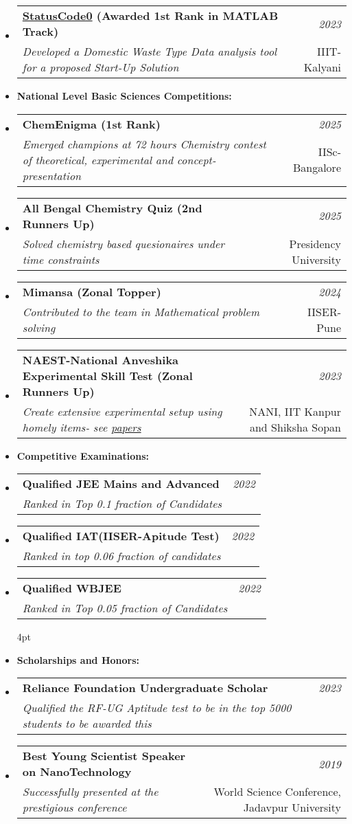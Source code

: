 \documentclass[a4paper,9pt]{article}
\makeatletter
\newcommand{\resumeSubheading}[4]{
    \item\small{
        \begin{tabular*}{0.97\textwidth}[t]{l@{\extracolsep{\fill}}r}
            \textbf{#1} & \textit{#2} \\
            \textit{#3} & \small{#4}
        \end{tabular*}
    }\vspace{3pt}
}
\makeatother
\begin{document}
{\begin{itemize}[leftmargin=*,label={},itemsep=4pt]
        \resumeSubheading{\href{https://statuscode0.devfolio.co/}{StatusCode0} (Awarded 1st Rank in MATLAB Track)}{2023}
    {Developed a Domestic Waste Type Data analysis tool for a proposed Start-Up Solution}{IIIT-Kalyani}
 
 \vspace{4pt}
    \large \item \textbf{National Level Basic Sciences Competitions:}
        \resumeSubheading{ChemEnigma (1st Rank)}{2025}
    {Emerged champions at 72 hours Chemistry contest of theoretical, experimental and concept-presentation}{IISc-Bangalore}
    \resumeSubheading{All Bengal Chemistry Quiz (2nd Runners Up)}{2025}
    {Solved chemistry based quesionaires under time constraints}{Presidency University}
    \resumeSubheading{Mimansa (Zonal Topper)}{2024}
    {Contributed to the team in Mathematical problem solving}{IISER-Pune}
   \resumeSubheading{NAEST-National Anveshika Experimental Skill Test (Zonal Runners Up)}{2023}
    {Create extensive experimental setup using homely items- see \href{https://github.com/Shuvam-Banerji-Seal/NAEST_Sample_Experiments}{papers}}{NANI, IIT Kanpur and Shiksha Sopan}  


    \item \textbf{Competitive Examinations:}
    \resumeSubheading{Qualified JEE Mains and Advanced}{2022}
    {Ranked in Top 0.1 fraction of Candidates}{}\vspace{-4pt}
    \resumeSubheading{Qualified IAT(IISER-Apitude Test)}{2022}
    {Ranked in top 0.06 fraction of candidates}{}\vspace{-4pt}
    \resumeSubheading{Qualified WBJEE}{2022}
    {Ranked in Top 0.05 fraction of Candidates}

    

    \vspace{4pt}\item \textbf{Scholarships and Honors:}
    \resumeSubheading{Reliance Foundation Undergraduate Scholar}{2023}
    {Qualified the RF-UG Aptitude test to be in the top 5000 students to be awarded this} {}\vspace{-2pt}
    \resumeSubheading{Best Young Scientist Speaker on NanoTechnology}{2019}
    {Successfully presented at the prestigious conference }{World Science Conference, Jadavpur University}
    
\end{itemize}
}
\end{document}
